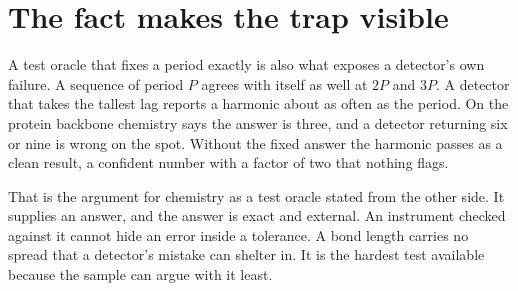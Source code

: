 \section{The fact makes the trap visible}

A test oracle that fixes a period exactly is also what exposes a detector's own failure. A sequence of
period $P$ agrees with itself as well at $2P$ and $3P$. A detector that takes the tallest lag
reports a harmonic about as often as the period. On the protein backbone chemistry says the answer
is three, and a detector returning six or nine is wrong on the spot. Without the fixed answer the
harmonic passes as a clean result, a confident number with a factor of two that nothing flags.

That is the argument for chemistry as a test oracle stated from the other side. It supplies an
answer, and the answer is exact and external. An instrument checked against it cannot hide an error
inside a tolerance. A bond length carries no spread that a detector's mistake can shelter in. It is
the hardest test available because the sample can argue with it least.
